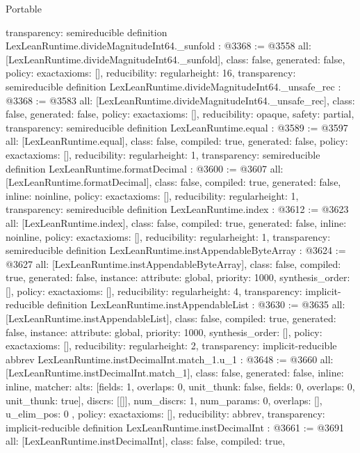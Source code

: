 \begin{lexlean}{Portable}
\begin{coremodule}
{  transparency: semireducible
}
definition LexLeanRuntime.divideMagnitudeInt64._sunfold : @3368 := @3558 {
  all: [LexLeanRuntime.divideMagnitudeInt64._sunfold],
  class: false,
  generated: false,
  policy: exact{axioms: []},
  reducibility: regular{height: 16},
  transparency: semireducible
}
definition LexLeanRuntime.divideMagnitudeInt64._unsafe_rec : @3368 := @3583 {
  all: [LexLeanRuntime.divideMagnitudeInt64._unsafe_rec],
  class: false,
  generated: false,
  policy: exact{axioms: []},
  reducibility: opaque{},
  safety: partial,
  transparency: semireducible
}
definition LexLeanRuntime.equal : @3589 := @3597 {
  all: [LexLeanRuntime.equal],
  class: false,
  compiled: true,
  generated: false,
  policy: exact{axioms: []},
  reducibility: regular{height: 1},
  transparency: semireducible
}
definition LexLeanRuntime.formatDecimal : @3600 := @3607 {
  all: [LexLeanRuntime.formatDecimal],
  class: false,
  compiled: true,
  generated: false,
  inline: noinline,
  policy: exact{axioms: []},
  reducibility: regular{height: 1},
  transparency: semireducible
}
definition LexLeanRuntime.index : @3612 := @3623 {
  all: [LexLeanRuntime.index],
  class: false,
  compiled: true,
  generated: false,
  inline: noinline,
  policy: exact{axioms: []},
  reducibility: regular{height: 1},
  transparency: semireducible
}
definition LexLeanRuntime.instAppendableByteArray : @3624 := @3627 {
  all: [LexLeanRuntime.instAppendableByteArray],
  class: false,
  compiled: true,
  generated: false,
  instance: {attribute: global, priority: 1000, synthesis_order: []},
  policy: exact{axioms: []},
  reducibility: regular{height: 4},
  transparency: implicit-reducible
}
definition LexLeanRuntime.instAppendableList : @3630 := @3635 {
  all: [LexLeanRuntime.instAppendableList],
  class: false,
  compiled: true,
  generated: false,
  instance: {attribute: global, priority: 1000, synthesis_order: []},
  policy: exact{axioms: []},
  reducibility: regular{height: 2},
  transparency: implicit-reducible
}
abbrev LexLeanRuntime.instDecimalInt.match_1.{u_1} : @3648 := @3660 {
  all: [LexLeanRuntime.instDecimalInt.match_1],
  class: false,
  generated: false,
  inline: inline,
  matcher: {
    alts: [{fields: 1, overlaps: 0, unit_thunk: false}, {fields: 0, overlaps: 0, unit_thunk: true}],
    discrs: [[]],
    num_discrs: 1,
    num_params: 0,
    overlaps: [],
    u_elim_pos: 0
  },
  policy: exact{axioms: []},
  reducibility: abbrev{},
  transparency: implicit-reducible
}
definition LexLeanRuntime.instDecimalInt : @3661 := @3691 {
  all: [LexLeanRuntime.instDecimalInt],
  class: false,
  compiled: true,
}
\end{coremodule}
\end{lexlean}
